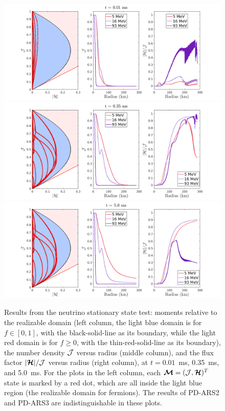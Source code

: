 \begin{figure}[h]
  \centering
    \includegraphics[width=.9\textwidth]{figures/NSS_1_1}\\
    \includegraphics[width=.9\textwidth]{figures/NSS_3_1} \\
    \includegraphics[width=.9\textwidth]{figures/NSS_5_1} \\
    \caption{Results from the neutrino stationary state test: moments relative to the realizable domain (left column, the light blue domain is for $f \in [0,1]$, with the black-solid-line as its boundary, while the light red domain is for $f\geq 0$, with the thin-red-solid-line as its boundary), the number density $\mathcal{J}$ versus radius (middle column), and the flux factor $|\boldsymbol{\mathcal{H}}|/\mathcal{J}$ versus radius (right column), at $t = 0.01$~ms, 0.35~ms, and 5.0~ms.  For the plots in the left column, each $\boldsymbol{\mathcal{M}}=(\mathcal{J},\boldsymbol{\mathcal{H}})^{T}$ state is marked by a red dot, which are all inside the light blue region (the realizable domain for fermions).  The results of PD-ARS2 and PD-ARS3 are indistinguishable in these plots.}
    \label{fig:NeutrinoStationaryTestEvolve}
\end{figure}